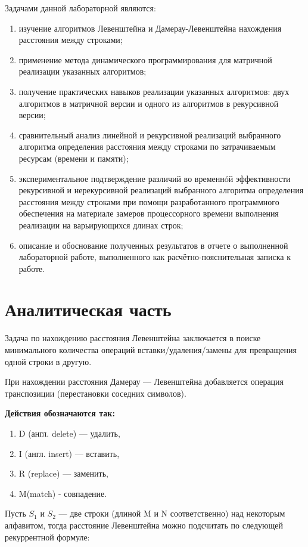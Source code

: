 \documentclass[12pt]{report}
\begin{document}
Задачами данной лабораторной являются:
\begin{enumerate}
	\item изучение алгоритмов Левенштейна и Дамерау-Левенштейна нахождения расстояния между строками;
	\item применение метода динамического программирования для матричной реализации указанных алгоритмов; 
	\item получение практических навыков реализации указанных алгоритмов: двух алгоритмов в матричной версии и одного из алгоритмов в рекурсивной версии; 
	\item сравнительный анализ линейной и рекурсивной реализаций выбранного алгоритма определения расстояния между строками по затрачиваемым ресурсам (времени и памяти); 
	\item экспериментальное подтверждение различий во временнóй эффективности рекурсивной и
	      нерекурсивной реализаций выбранного алгоритма определения расстояния между строками при
	      помощи разработанного программного обеспечения на материале замеров процессорного времени
	      выполнения реализации на варьирующихся длинах строк; 
	\item описание и обоснование полученных результатов в отчете о выполненной лабораторной
	      работе, выполненного как расчётно-пояснительная записка к работе. 
\end{enumerate}

\chapter{Аналитическая часть}
Задача по нахождению расстояния Левенштейна заключается в поиске минимального количества операций вставки/удаления/замены для превращения одной строки в другую.

При нахождении расстояния Дамерау — Левенштейна добавляется операция транспозиции (перестановки соседних символов).  
	
\textbf{Действия обозначаются так:} 
\begin{enumerate}
	\item D (англ. delete) — удалить,
	\item I (англ. insert) — вставить,
	\item R (replace) — заменить,
	\item M(match) - совпадение.
\end{enumerate}

Пусть $S_{1}$ и $S_{2}$ — две строки (длиной M и N соответственно) над некоторым алфавитом, тогда расстояние Левенштейна можно подсчитать по следующей рекуррентной формуле:
\end{document}
